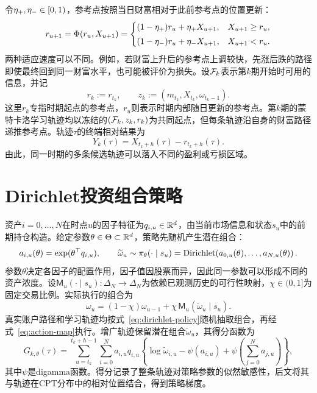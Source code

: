 令$\eta_{+},\eta_{-}\in[0,1)$，参考点按照当日财富相对于此前参考点的位置更新：
\begin{equation}\label{eq:reference-update}
 r_{u+1}=\Phi(r_u,X_{u+1})
 =\begin{cases}
 (1-\eta_{+})r_u+\eta_{+} X_{u+1}, & X_{u+1}\ge r_u,\\[1mm]
 (1-\eta_{-})r_u+\eta_{-} X_{u+1}, & X_{u+1}<r_u.
 \end{cases}
\end{equation}
两种适应速度可以不同。例如，若财富上升后的参考点上调较快，先涨后跌的路径即使最终回到同一财富水平，也可能被评价为损失。设$\mathcal F_k$表示第$k$期开始时可用的信息，并记
\begin{equation}\label{eq:start-context}
 r_k:=r_{t_k},
 \qquad
 z_k:=(m_{t_k},X_{t_k},\omega_{t_k-1}).
\end{equation}
这里$r_k$专指时期起点的参考点，$r_u$则表示时期内部随日更新的参考点。第$k$期的蒙特卡洛学习轨迹均以冻结的$(\mathcal F_k,z_k,r_k)$为共同起点，但每条轨迹沿自身的财富路径递推参考点。轨迹$\tau$的终端相对结果为
\begin{equation}\label{eq:relative-outcome}
 Y_k(\tau)=X_{t_k+h}(\tau)-r_{t_k+h}(\tau).
\end{equation}
由此，同一时期的多条候选轨迹可以落入不同的盈利或亏损区域。

\section{Dirichlet投资组合策略}

资产$i=0,\ldots,N$在时点$u$的因子特征为$q_{i,u}\in\mathbb R^d$，由当前市场信息和状态$s_u$中的前期持仓构造。给定参数$\theta\in\Theta\subset\mathbb R^d$，策略先随机产生潜在组合：
\begin{equation}\label{eq:dirichlet-policy}
 a_{i,u}(\theta)=\exp(\theta^\top q_{i,u}),
 \qquad
 \widetilde\omega_u\sim
 \pi_\theta(\cdot\mid s_u)
 =\operatorname{Dirichlet}\!\left(a_{0,u}(\theta),\ldots,a_{N,u}(\theta)\right).
\end{equation}
参数$\theta$决定各因子的配置作用，因子值因股票而异，因此同一参数可以形成不同的资产浓度。设$\mathsf M_u(\cdot\mid s_u):\Delta_N\to\Delta_N$为依赖已观测历史的可行性映射，$\chi\in(0,1]$为固定交易比例。实际执行的组合为
\begin{equation}\label{eq:action-map}
 \omega_u=(1-\chi)\omega_{u-1}+\chi\,\mathsf M_u(\widetilde\omega_u\mid s_u).
\end{equation}
真实账户路径和学习轨迹均按式~\eqref{eq:dirichlet-policy}随机抽取组合，再经式~\eqref{eq:action-map}执行。增广轨迹保留潜在组合$\widetilde\omega_u$，其得分函数为
\begin{equation}\label{eq:trajectory-score}
 G_{k,\theta}(\tau)
 =\sum_{u=t_k}^{t_k+h-1}\sum_{i=0}^{N}
 a_{i,u}q_{i,u}
 \left\{\log\widetilde\omega_{i,u}
 -\psi(a_{i,u})+\psi\!\left(\sum_{j=0}^{N}a_{j,u}\right)\right\},
\end{equation}
其中$\psi$是digamma函数。得分记录了整条轨迹对策略参数的似然敏感性，后文将其与轨迹在CPT分布中的相对位置结合，得到策略梯度。

